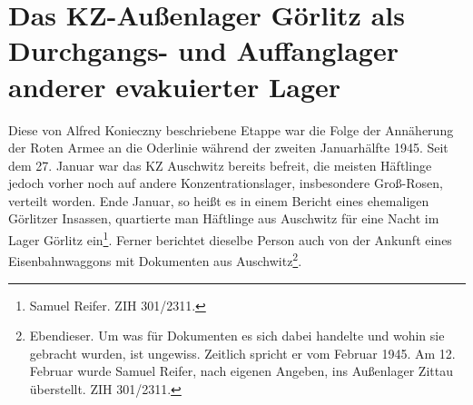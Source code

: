 \section{Das KZ-Außenlager Görlitz als Durchgangs- und Auffanglager anderer evakuierter Lager}

Diese von Alfred Konieczny\label{eva_2} beschriebene Etappe war die Folge der Annäherung der Roten Armee an die Oderlinie während der zweiten Januarhälfte 1945. Seit dem 27. Januar war das KZ Auschwitz bereits befreit, die meisten Häftlinge jedoch vorher noch auf andere Konzentrationslager, insbesondere Groß-Rosen, verteilt worden. Ende Januar, so heißt es in einem Bericht eines ehemaligen Görlitzer Insassen, quartierte man Häftlinge aus Auschwitz für eine Nacht im Lager Görlitz ein\footnote{Samuel Reifer. ZIH 301/2311.}. Ferner berichtet dieselbe Person auch von der Ankunft eines Eisenbahnwaggons mit Dokumenten aus Auschwitz\footnote{Ebendieser. Um was für Dokumenten es sich dabei handelte und wohin sie gebracht wurden, ist ungewiss. Zeitlich spricht er vom Februar 1945. Am 12. Februar wurde Samuel Reifer, nach eigenen Angeben, ins Außenlager Zittau überstellt. ZIH 301/2311.}.
 

